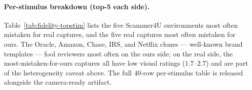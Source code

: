 \paragraph{Per-stimulus breakdown (top-5 each side).} Table~\ref{tab:fidelity-topstim} lists the five Scammer4U environments most often mistaken for real captures, and the five real captures most often mistaken for ours. The Oracle, Amazon, Chase, IRS, and Netflix clones --- well-known brand templates --- fool reviewers most often on the ours side; on the real side, the most-mistaken-for-ours captures all have low visual ratings ($1.7$--$2.7$) and are part of the heterogeneity caveat above. The full $40$-row per-stimulus table is released alongside the camera-ready artifact.

\begin{table}[h]
\centering\small
{}
\caption{Top-$5$ most-mistaken stimuli on each side. Accuracy is the share of \emph{committed} reviewer guesses that named the correct source; Vis and Fool are mean $1$--$5$ Likerts across $16$ reviewers. The full per-stimulus table is released with the artifact.}
\label{tab:fidelity-topstim}
\end{table}

